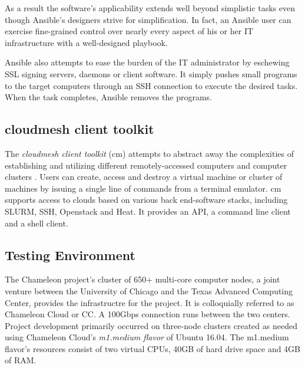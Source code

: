 \documentclass[9pt,twocolumn,twoside]{../../styles/osajnl}
\begin{document}
As a result the software's applicability extends well beyond simplistic tasks even though Ansible's designers strive for simplification.  In fact, an Ansible user can exercise fine-grained control over nearly every aspect of his or her IT infrastructure with a well-designed playbook.  

Ansible also attempts to ease the burden of the IT administrator by eschewing SSL signing servers, daemons or client software.  It simply pushes small programs to the target computers through an SSH connection to execute the desired tasks.  When the task completes, Ansible removes the programs. 

\subsection{cloudmesh client toolkit}
The \textit{cloudmesh client toolkit} (cm) attempts to abstract away the complexities of establishing and utilizing different remotely-accessed computers and computer clusters \cite{www-cm}.  Users can create, access and destroy a virtual machine or cluster of machines by issuing a single line of commands from a terminal emulator.  cm supports access to clouds based on various back end-software stacks, including SLURM, SSH, Openstack and Heat.  It provides an API, a command line client and a shell client.

\subsection{Testing Environment}
The Chameleon project's cluster of 650+ multi-core computer nodes, a joint venture between the University of Chicago and the Texas Advanced Computing Center, provides the infrastructre for the project.  It is colloquially referred to as Chameleon Cloud or CC.  A 100Gbps connection runs between the two centers. Project development primarily occurred on three-node clusters created as needed using Chameleon Cloud's \textit{m1.medium flavor} of Ubuntu 16.04.  The m1.medium flavor's resources consist of two virtual CPUs, 40GB of hard drive space and 4GB of RAM.  
\end{document}
